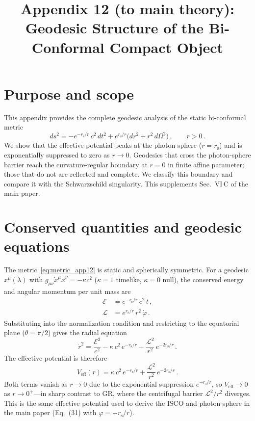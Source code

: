 \documentclass[11pt]{article}
\title{Appendix 12 (to main theory): Geodesic Structure of the
  Bi-Conformal Compact Object}
\author{}
\date{}
\newcommand{\rs}{r_{\mathrm{s}}}
\begin{document}
\let\phi\varphi
\maketitle

\section*{Purpose and scope}

This appendix provides the complete geodesic analysis of
the static bi-conformal metric
\begin{equation}\label{eq:metric_app12}
  ds^{2} = -e^{-\rs/r}\,c^{2}\,dt^{2}
  + e^{\rs/r}\bigl(dr^{2} + r^{2}\,d\Omega^{2}\bigr)\,,
  \qquad r > 0\,.
\end{equation}
We show that the effective potential peaks at the photon
sphere ($r = \rs$) and is exponentially suppressed to zero
as $r \to 0$.  Geodesics that cross the photon-sphere
barrier reach the curvature-regular boundary at $r = 0$ in
finite affine parameter; those that do not are reflected
and complete.  We classify this boundary and compare it
with the Schwarzschild singularity.  This supplements
Sec.~VI\,C of the main paper.


\section{Conserved quantities and geodesic equations}
\label{sec:conserved}

The metric~\eqref{eq:metric_app12} is static and spherically
symmetric.  For a geodesic $x^{\mu}(\lambda)$ with
$g_{\mu\nu}\dot{x}^{\mu}\dot{x}^{\nu} = -\kappa c^{2}$
($\kappa = 1$ timelike, $\kappa = 0$ null), the conserved
energy and angular momentum per unit mass are
\begin{align}
  \mathcal{E} &= e^{-\rs/r}\,c^{2}\,\dot{t}\,,
  \label{eq:energy}\\
  \mathcal{L} &= e^{\rs/r}\,r^{2}\,\dot{\phi}\,.
  \label{eq:ang_mom}
\end{align}
Substituting into the normalization condition and
restricting to the equatorial plane ($\theta = \pi/2$)
gives the radial equation
\begin{equation}\label{eq:radial}
  \dot{r}^{2} = \frac{\mathcal{E}^{2}}{c^{2}}
  - \kappa\,c^{2}\,e^{-\rs/r}
  - \frac{\mathcal{L}^{2}}{r^{2}}\,e^{-2\rs/r}\,.
\end{equation}
The effective potential is therefore
\begin{equation}\label{eq:Veff_app12}
  V_{\mathrm{eff}}(r) = \kappa\,c^{2}\,e^{-\rs/r}
  + \frac{\mathcal{L}^{2}}{r^{2}}\,e^{-2\rs/r}\,.
\end{equation}
Both terms vanish as $r \to 0$ due to the exponential
suppression $e^{-\rs/r}$, so
$V_{\mathrm{eff}} \to 0$ as $r \to 0^{+}$---in sharp
contrast to GR, where the centrifugal barrier
$\mathcal{L}^{2}/r^{2}$ diverges.  This is the same
effective potential used to derive the ISCO and photon
sphere in the main paper (Eq.~(31) with
$\varphi = -\rs/r$).
\end{document}
